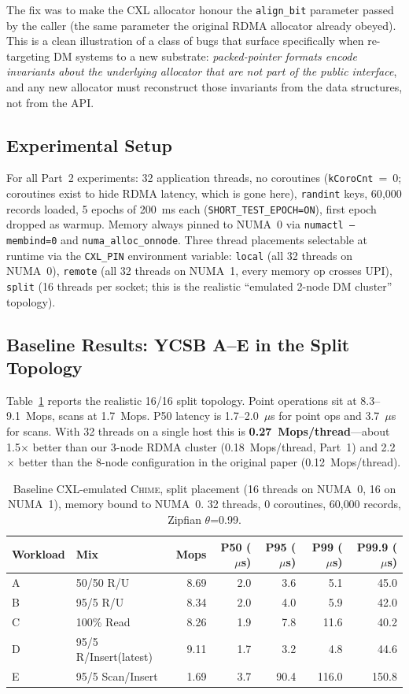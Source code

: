 \documentclass[11pt]{article}
\begin{document}
The fix was to make the CXL allocator honour the \texttt{align\_bit} parameter passed by the caller (the same parameter the original RDMA allocator already obeyed). This is a clean illustration of a class of bugs that surface specifically when re-targeting DM systems to a new substrate: \emph{packed-pointer formats encode invariants about the underlying allocator that are not part of the public interface}, and any new allocator must reconstruct those invariants from the data structures, not from the API.

\subsection{Experimental Setup}
For all Part~2 experiments: 32 application threads, no coroutines (\texttt{kCoroCnt}~=~0; coroutines exist to hide RDMA latency, which is gone here), \texttt{randint} keys, 60{,}000 records loaded, 5 epochs of 200~ms each (\texttt{SHORT\_TEST\_EPOCH=ON}), first epoch dropped as warmup. Memory always pinned to NUMA~0 via \texttt{numactl --membind=0} and \texttt{numa\_alloc\_onnode}. Three thread placements selectable at runtime via the \texttt{CXL\_PIN} environment variable: \texttt{local} (all 32 threads on NUMA~0), \texttt{remote} (all 32 threads on NUMA~1, every memory op crosses UPI), \texttt{split} (16 threads per socket; this is the realistic ``emulated 2-node DM cluster'' topology).

\subsection{Baseline Results: YCSB A--E in the Split Topology}
Table~\ref{tab:p2_baseline} reports the realistic 16/16 split topology. Point operations sit at 8.3--9.1~Mops, scans at 1.7~Mops. P50 latency is 1.7--2.0~$\mu$s for point ops and 3.7~$\mu$s for scans. With 32 threads on a single host this is \textbf{0.27~Mops/thread}---about 1.5$\times$ better than our 3-node RDMA cluster (0.18~Mops/thread, Part~1) and 2.2$\times$ better than the 8-node configuration in the original paper (0.12~Mops/thread).

\begin{table}[h]
\centering
\small
\begin{tabular}{@{}llrrrrr@{}}
\toprule
\textbf{Workload} & \textbf{Mix} & \textbf{Mops} & \textbf{P50 ($\mu$s)} & \textbf{P95 ($\mu$s)} & \textbf{P99 ($\mu$s)} & \textbf{P99.9 ($\mu$s)} \\ \midrule
A & 50/50 R/U & 8.69 & 2.0 & 3.6 & 5.1 & 45.0 \\
B & 95/5 R/U & 8.34 & 2.0 & 4.0 & 5.9 & 42.0 \\
C & 100\% Read & 8.26 & 1.9 & 7.8 & 11.6 & 40.2 \\
D & 95/5 R/Insert(latest) & 9.11 & 1.7 & 3.2 & 4.8 & 44.6 \\
E & 95/5 Scan/Insert & 1.69 & 3.7 & 90.4 & 116.0 & 150.8 \\ \bottomrule
\end{tabular}
\caption{Baseline CXL-emulated \textsc{Chime}, split placement (16 threads on NUMA~0, 16 on NUMA~1), memory bound to NUMA~0. 32 threads, 0 coroutines, 60{,}000 records, Zipfian $\theta$=0.99.}
\label{tab:p2_baseline}
\end{table}
\end{document}

